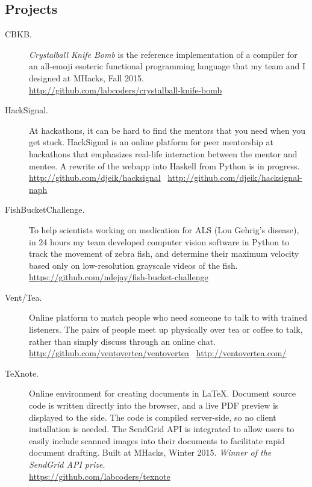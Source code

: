 \documentclass{article}
\begin{document}
\subsection*{Projects}

\begin{description}
    \item[CBKB.] \emph{Crystalball Knife Bomb} is the reference implementation
        of a compiler for an all-emoji esoteric functional programming language
        that my team and I designed at MHacks, Fall 2015. \\
        \url{http://github.com/labcoders/crystalball-knife-bomb}
    \item[HackSignal.] At hackathons, it can be hard to find the mentors that
        you need when you get stuck. HackSignal is an online platform for peer
        mentorship at hackathons that emphasizes real-life interaction between
        the mentor and mentee. A rewrite of the webapp into Haskell from Python
        is in progress. \\
        \url{http://github.com/djeik/hacksignal}~
        \url{http://github.com/djeik/hacksignal-naph}
    \item[FishBucketChallenge.] To help scientists working on medication for
        ALS (Lou Gehrig's disease), in 24 hours my team developed computer
        vision software in Python to track the movement of zebra fish, and
        determine their maximum velocity based only on low-resolution grayscale
        videos of the fish. \\
        \url{https://github.com/ndejay/fish-bucket-challenge}
    \item[Vent/Tea.] Online platform to match people who need someone to talk
        to with trained listeners. The pairs of people meet up physically over
        tea or coffee to talk, rather than simply discuss through an online
        chat. \\
        \url{http://github.com/ventovertea/ventovertea}~
        \url{http://ventovertea.com/}
    \item[TeXnote.] Online environment for creating documents in \LaTeX.
        Document source code is written directly into the browser, and a live
        PDF preview is displayed to the side. The code is compiled server-side,
        so no client installation is needed. The SendGrid API is integrated to
        allow users to easily include scanned images into their documents to
        facilitate rapid document drafting. Built at MHacks, Winter 2015.
        \emph{Winner of the SendGrid API prize.} \\
        \url{https://github.com/labcoders/texnote}
\end{description}
\end{document}
